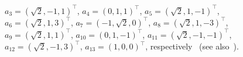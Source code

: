 \documentclass[%
  twocolumn,
 showpacs,
 showkeys,
 preprintnumbers,
 amsmath,amssymb,
 aps,
  pra,
  longbibliography,
 floatfix,
 ]{revtex4-1}
\begin{document}
\begin{figure}
{$a_{3}     = \left(   \sqrt{2},-1,1     \right)^\intercal $,
$a_{4}     = \left(    0,1,1     \right)^\intercal $,
$a_{5}     = \left(   \sqrt{2},1,-1     \right)^\intercal $,
$a_{6}     = \left(\sqrt{2}, 1, 3 \right)^\intercal $,
$a_{7}     = \left(    -1,\sqrt{2},0     \right)^\intercal $,
$a_{8}     = \left(\sqrt{2}, 1, -3 \right)^\intercal $,
$a_{9}     = \left(   \sqrt{2},1,1     \right)^\intercal $,
$a_{10}     = \left(    0,1,-1     \right)^\intercal $,
$a_{11}     = \left(   \sqrt{2},-1,-1     \right)^\intercal $,
$a_{12}     = \left(\sqrt{2}, -1, 3 \right)^\intercal $,
$a_{13}     = \left(    1,0,0     \right)^\intercal $,
respectively~\cite[p.~206, Fig.~1]{tkadlec-96}
(see also~\cite[Fig.~4, p.~5387]{svozil-tkadlec}).
%
%
%
}
\end{figure}
\end{document}
